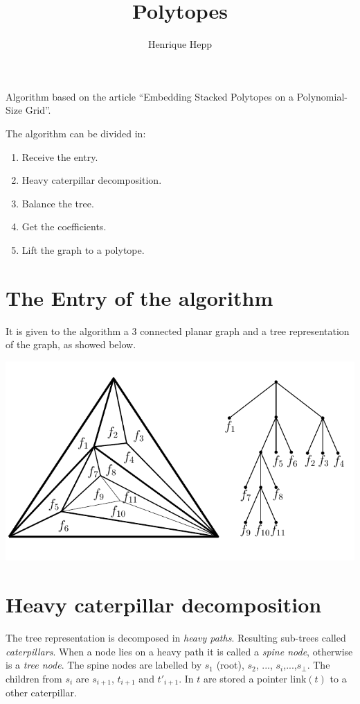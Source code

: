 \documentclass[10pt,a4paper]{article}
\title{Polytopes}
\author{Henrique Hepp}
\begin{document}
\maketitle

Algorithm based on the article ``Embedding Stacked Polytopes on a Polynomial-Size Grid''.

The algorithm can be divided in:

\begin{enumerate}
\item Receive the entry.
\item Heavy caterpillar decomposition.
\item Balance the tree.
\item Get the coefficients.
\item Lift the graph to a polytope. 
\end{enumerate}


\section{The Entry of the algorithm}

It is given to the algorithm a 3 connected planar graph and a tree representation of the graph, as showed below.

\includegraphics[scale=0.8]{graph_tree.png} 

\section{Heavy caterpillar decomposition}
The tree representation is decomposed in \textit{heavy paths}. Resulting sub-trees called \textit{caterpillars}. When a node lies on a heavy path it is called a \textit{spine node}, otherwise is a \textit{tree node}. The spine nodes are labelled by $s_1$ (root), $s_2$, ..., $s_i$,...,$s_\bot$. The children from $s_i$ are $s_{i+1}$, $t_{i+1}$ and $t'_{i+1}$. In $t$ are stored a pointer link$(t)$ to a other caterpillar. 
\end{document}
